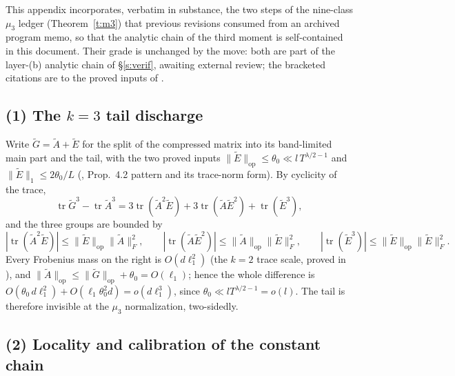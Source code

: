 \documentclass[11pt]{article}
\numberwithin{equation}{section}
\theoremstyle{definition}
\theoremstyle{remark}
\begin{document}
This appendix incorporates, verbatim in substance, the two
steps of the nine-class $\mu_3$ ledger
(Theorem~\ref{t:m3}) that previous revisions consumed from an
archived program memo, so that the analytic chain of the third
moment is self-contained in this document. Their grade is
unchanged by the move: both are part of the layer-(b) analytic
chain of \S\ref{s:verif}, awaiting external review; the
bracketed citations are to the proved inputs of \cite{C26}.

\subsection*{(1) The $k=3$ tail discharge}

Write $\widetilde G=\widetilde A+\widetilde E$ for the split of
the compressed matrix into its band-limited main part and the
tail, with the two proved inputs
$\|\widetilde E\|_{\mathrm{op}}\le\theta_0\ll l\,T^{\lambda/2-1}$
and $\|\widetilde E\|_{1}\le 2\theta_0/L$
(\cite{C26}, Prop.~4.2 pattern and its trace-norm form). By
cyclicity of the trace,
\[
\operatorname{tr}\widetilde G^{3}-\operatorname{tr}\widetilde A^{3}
=3\operatorname{tr}(\widetilde A^{2}\widetilde E)
+3\operatorname{tr}(\widetilde A\widetilde E^{2})
+\operatorname{tr}(\widetilde E^{3}),
\]
and the three groups are bounded by
\[
|\operatorname{tr}(\widetilde A^{2}\widetilde E)|
\le\|\widetilde E\|_{\mathrm{op}}\|\widetilde A\|_{F}^{2},
\qquad
|\operatorname{tr}(\widetilde A\widetilde E^{2})|
\le\|\widetilde A\|_{\mathrm{op}}\|\widetilde E\|_{F}^{2},
\qquad
|\operatorname{tr}(\widetilde E^{3})|
\le\|\widetilde E\|_{\mathrm{op}}\|\widetilde E\|_{F}^{2}.
\]
Every Frobenius mass on the right is $O(d\ell_1^{2})$ (the
$k=2$ trace scale, proved in \cite{C26}), and
$\|\widetilde A\|_{\mathrm{op}}\le\|\widetilde G\|_{\mathrm{op}}
+\theta_0=O(\ell_1)$; hence the whole difference is
$O(\theta_0\,d\ell_1^{2})+O(\ell_1\theta_0^{2}d)
=o(d\ell_1^{3})$, since $\theta_0\ll lT^{\lambda/2-1}=o(l)$.
The tail is therefore invisible at the $\mu_3$ normalization,
two-sidedly.

\subsection*{(2) Locality and calibration of the constant
chain}
\end{document}
